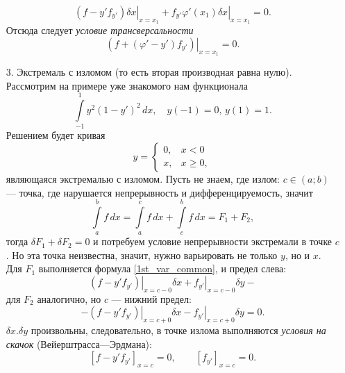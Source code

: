 \documentclass[12pt,a5paper]{book}
\begin{document}
\begin{itemize}
\begin{equation*}
			\left.\left(f - y'f_{y'}\right)\delta x\right|_{x=x_1} + \left.f_{y'}\varphi'(x_1)\delta x\right|_{x=x_1} = 0.
		\end{equation*}
		Отсюда следует \emph{условие трансверсальности}
		\begin{equation*}
			\left.\left(f + \left(\varphi' - y'\right)f_{y'}\right)\right|_{x=x_1} = 0.
		\end{equation*}
		\item [3.] Экстремаль с изломом (то есть вторая производная равна нулю). Рассмотрим на примере уже знакомого нам функционала
		\begin{equation*}
			\int\limits_{-1}^1 y^2\left(1-y'\right)^2\,dx, \quad y(-1) = 0, \, y(1) = 1.
		\end{equation*}
		Решением будет кривая
		\begin{equation*}
			y = \begin{cases}
				0, & x < 0 \\
				x, & x \geq 0,
			\end{cases}
		\end{equation*}
		являющаяся экстремалью с изломом. Пусть не знаем, где излом: $c \in (a;b)$ --- точка, где нарушается непрерывность и дифференцируемость, значит
		\begin{equation*}
			\int\limits_a^b f\,dx = \int\limits_a^c f\,dx + \int\limits_c^b f\,dx = F_1 + F_2,
		\end{equation*}
		тогда $\delta F_1 + \delta F_2 = 0$ и потребуем условие непрерывности экстремали в точке $c$. Но эта точка неизвестна, значит, нужно варьировать не только $y$, но и $x$. Для $F_1$ выполняется формула \eqref{1st_var_common}, и предел слева:
		\begin{equation*}
			\left.\left(f - y'f_{y'}\right)\right|_{x=c-0}\delta x + \left.f_{y'}\right|_{x=c-0}\delta y -
		\end{equation*}
		для $F_2$ аналогично, но $c$ --- нижний предел:
		\begin{equation*}
			- \left.\left(f - y'f_{y'}\right)\right|_{x=c+0}\delta x - \left.f_{y'}\right|_{x=c+0}\delta y = 0.
		\end{equation*}
		$\delta x. \delta y$ произвольны, следовательно, в точке излома выполняются \emph{условия на скачок} (Вейерштрасса---Эрдмана):
		\begin{equation*}
			\left[f - y'f_{y'}\right]_{x=c} = 0, \qquad \left[f_{y'}\right]_{x=c} = 0.
		\end{equation*}
	\end{itemize}
\end{document}
